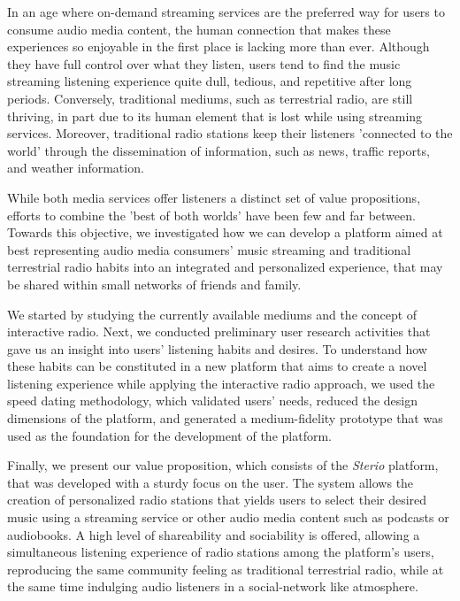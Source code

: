\label{chap:conclusion}

In an age where on-demand streaming services are the preferred way for users to consume audio media content, the human connection that makes these experiences so enjoyable in the first place is lacking more than ever. Although they have full control over what they listen, users tend to find the music streaming listening experience quite dull, tedious, and repetitive after long periods. Conversely, traditional mediums, such as terrestrial radio, are still thriving, in part due to its human element that is lost while using streaming services. Moreover, traditional radio stations keep their listeners 'connected to the world' through the dissemination of information, such as news, traffic reports, and weather information. 

While both media services offer listeners a distinct set of value propositions, efforts to combine the ’best of both worlds’ have been few and far between. Towards this objective, we investigated how we can develop a platform aimed at best representing audio media consumers’ music streaming and traditional terrestrial radio habits into an integrated and personalized experience, that may be shared within small networks of friends and family.

We started by studying the currently available mediums and the concept of interactive radio. Next, we conducted preliminary user research activities that gave us an insight into users’ listening habits and desires. To understand how these habits can be constituted in a new platform that aims to create a novel listening experience while applying the interactive radio approach, we used the speed dating methodology, which validated users' needs, reduced the design dimensions of the platform, and generated a medium-fidelity prototype that was used as the foundation for the development of the platform. 

Finally, we present our value proposition, which consists of the \textit{Sterio} platform, that was developed with a sturdy focus on the user. The system allows the creation of personalized radio stations that yields users to select their desired music using a streaming service or other audio media content such as podcasts or audiobooks. A high level of shareability and sociability is offered, allowing a simultaneous listening experience of radio stations among the platform's users, reproducing the same community feeling as traditional terrestrial radio, while at the same time indulging audio listeners in a social-network like atmosphere.

